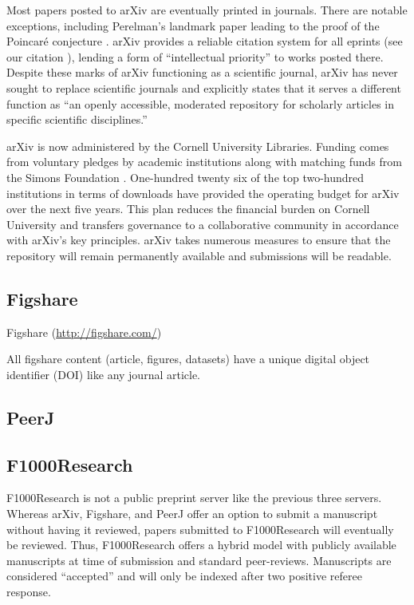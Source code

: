 \documentclass[letterpaper,twocolumn,superscriptaddress,showkeys]{revtex4}
\begin{document}
Most papers posted to arXiv are eventually printed in journals.  There
are notable exceptions, including Perelman's landmark paper leading to
the proof of the Poincar\'{e} conjecture \cite{2002math.....11159P}.
arXiv provides a reliable citation system for all eprints (see our
citation \cite{2002math.....11159P}), lending a form of ``intellectual
priority'' to works posted there.  Despite these marks of arXiv 
functioning as a scientific journal, arXiv has never sought to replace
scientific journals and explicitly states that it serves a different
function as ``an openly accessible, moderated repository for scholarly
articles in specific scientific disciplines.''

arXiv is now administered by the Cornell University Libraries.
Funding comes from voluntary pledges by academic institutions along
with matching funds from the Simons Foundation \cite{arxiv_future}.
One-hundred twenty six of the top two-hundred institutions in terms of
downloads have provided the operating budget for arXiv over the next
five years.  This plan reduces the financial burden on Cornell
University and transfers governance to a collaborative community in
accordance with arXiv's key principles.  arXiv takes numerous measures
to ensure that the repository will remain permanently available and
submissions will be readable.

\subsection{Figshare}


Figshare (\href{http://figshare.com/}{http://figshare.com/})

All figshare content (article, figures, datasets) have a unique digital object
identifier (DOI) like any journal article.

\subsection{PeerJ}


\subsection{F1000Research}


F1000Research is not a public preprint server like the previous three servers.
Whereas arXiv, Figshare, and PeerJ offer an option to submit a manuscript
without having it reviewed, papers submitted to F1000Research will eventually be
reviewed. Thus, F1000Research offers a hybrid model with publicly available
manuscripts at time of submission and standard peer-reviews. Manuscripts are
considered ``accepted'' and will only be indexed after two positive referee
response.
\end{document}
